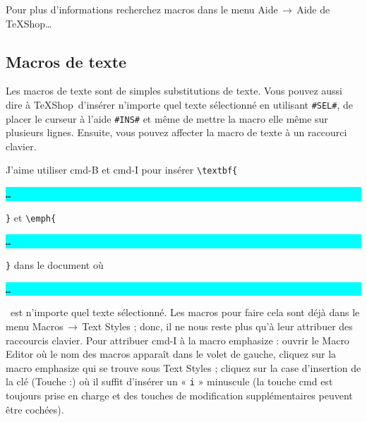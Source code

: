 \documentclass[11pt,french]{article}
\newcommand{\TS}{\textsf{\TeX Shop}}
\newcommand{\cmd}[1]{\textsf{#1}}
\newcommand{\mnu}[1]{\textsf{#1}}
\newcommand{\To}{\,\(\to\)\,}
\newcommand{\selection}{\colorbox{cyan}{\rule[-0.5ex]{0ex}{2.1ex}\texttt{…}}}
\begin{document}

Pour plus d'informations recherchez \cmd{macros} dans le menu \mnu{Aide}\To\mnu{Aide de TeXShop…}

\subsection{Macros de texte} %

Les macros de texte sont de simples substitutions de texte. Vous pouvez aussi dire à \TS\ d'insérer n'importe quel texte sélectionné en utilisant \verb|#SEL#|, de placer le curseur à l'aide \verb|#INS#| et même de mettre la macro elle même sur plusieurs lignes. Ensuite, vous pouvez affecter la macro de texte à un raccourci clavier.

J'aime utiliser \cmd{cmd-B} et \cmd{cmd-I} pour insérer \verb|\textbf{|\selection\verb|}| et \verb|\emph{|\selection\verb|}| dans le document où \selection\ est n'importe quel texte sélectionné. Les macros pour faire cela sont déjà dans le menu \mnu{Macros}\To\mnu{Text Styles} ; donc, il ne nous reste plus qu'à leur attribuer des raccourcis clavier. Pour attribuer \cmd{cmd-I} à la macro \mnu{emphasize} : ouvrir le \mnu{Macro Editor} où le nom des macros apparaît dans le volet de gauche, cliquez sur la macro \mnu{emphasize} qui se trouve sous \mnu{Text Styles} ; cliquez sur la case d'insertion de la clé (\mnu{Touche :}) où il suffit d'insérer un « \texttt{i} » minuscule (la touche \cmd{cmd} est toujours prise en charge et des touches de modification supplémentaires peuvent être cochées).

\end{document}
